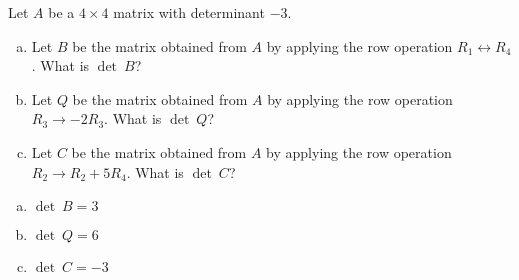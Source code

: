 
\begin{exerciseStatement}


Let \(A\) be a \(4 \times 4\) matrix with determinant \( -3 \).


\begin{enumerate}[(a)]
\item Let \(B\) be the matrix obtained from \(A\) by applying the row operation \( R_1 \leftrightarrow R_4 \). What is \(\operatorname{det}\ B\)?
\item Let \(Q\) be the matrix obtained from \(A\) by applying the row operation \( R_3 \to -2R_3 \). What is \(\operatorname{det}\ Q\)?
\item Let \(C\) be the matrix obtained from \(A\) by applying the row operation \( R_2 \to R_2 + 5R_4 \). What is \(\operatorname{det}\ C\)?
\end{enumerate}
    
\end{exerciseStatement}
    
\begin{exerciseAnswer} 

\begin{enumerate}[(a)]
\item \(\operatorname{det}\ B= 3 \)
\item \(\operatorname{det}\ Q= 6 \)
\item \(\operatorname{det}\ C= -3 \)
\end{enumerate}
    
\end{exerciseAnswer}
    
